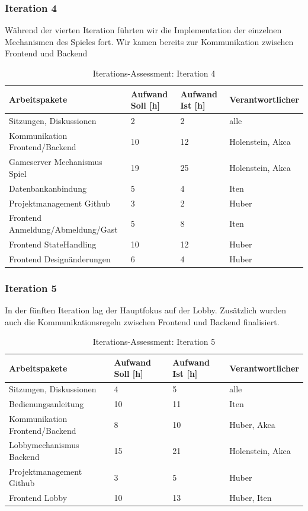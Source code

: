 \documentclass[11pt,ngerman]{article}
\begin{document}
\subsubsection{Iteration 4}

Während der vierten Iteration führten wir die Implementation der einzelnen Mechanismen des Spieles fort. Wir kamen bereits zur Kommunikation zwischen Frontend und Backend

\begin{table}[H]
	\caption{Iterations-Assessment: Iteration 4}
	\begin{tabularx}{\textwidth}{X l l l}
		\toprule
		Arbeitspakete & Aufwand Soll [h] & Aufwand Ist [h] & Verantwortlicher \\
		\toprule
		Sitzungen, Diskussionen & 2 & 2 & alle \\
		Kommunikation Frontend/Backend & 10 & 12 & Holenstein, Akca \\
		Gameserver Mechanismus Spiel & 19 & 25 & Holenstein, Akca \\
		Datenbankanbindung & 5 & 4  & Iten \\
		Projektmanagement Github & 3 & 2  & Huber \\
		Frontend Anmeldung/Abmeldung/Gast & 5 & 8   & Iten \\
		Frontend StateHandling & 10 & 12   & Huber \\
		Frontend Designänderungen & 6 & 4 & Huber \\
		\bottomrule
	\end{tabularx}
	\label{tab:Iterations-Assessment: Iteration 4}
\end{table}

\subsubsection{Iteration 5}

In der fünften Iteration lag der Hauptfokus auf der Lobby. Zusätzlich wurden auch die Kommunikationsregeln zwischen Frontend und Backend finalisiert.

\begin{table}[H]
	\caption{Iterations-Assessment: Iteration 5}
	\begin{tabularx}{\textwidth}{X l l l}
		\toprule
		Arbeitspakete & Aufwand Soll [h] & Aufwand Ist [h] & Verantwortlicher \\
		\toprule
		Sitzungen, Diskussionen & 4 & 5 & alle \\
		Bedienungsanleitung & 10 & 11 & Iten \\
		Kommunikation Frontend/Backend & 8 & 10 & Huber, Akca \\
		Lobbymechanismus Backend & 15 & 21 & Holenstein, Akca \\
		Projektmanagement Github & 3 & 5 & Huber \\
		Frontend Lobby & 10 & 13 & Huber, Iten \\
		\bottomrule
	\end{tabularx}
	\label{tab:Iterations-Assessment: Iteration 5}
\end{table}
\end{document}
